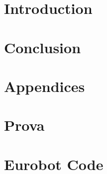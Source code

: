 \documentclass[11pt, twoside]{article}
\numberwithin{equation}{section}
\begin{document}
\cleardoublepage


\setcounter{tocdepth}{3}

\tableofcontents

\cleardoublepage



\printnoidxglossaries

\cleardoublepage




\section{Introduction}
\label{sec:introduction}


\section{Conclusion}
\label{sec:conclusion}







\clearpage


\setcounter{subsection}{0}
\setcounter{section}{0}


\section*{Appendices}%

\renewcommand\thesection{\Alph{section}}
\renewcommand\thesubsection{\thesection.\arabic{subsection}}%


\section{Prova}
\label{app:prova}


%

\section{Eurobot Code}
\label{app:placeholder}
\inputminted[xleftmargin=\parindent,linenos, baselinestretch=0.9, fontsize=\footnotesize]{c}{code/prova.C}
\end{document}
